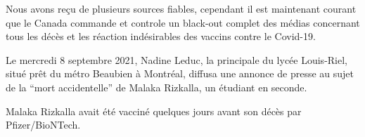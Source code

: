 Nous avons reçu de plusieurs sources fiables, cependant il est maintenant
courant que le Canada commande et controle un black-out complet des médias
concernant tous les décès et les réaction indésirables des vaccins contre le
Covid-19.

Le mercredi 8 septembre 2021, Nadine Leduc, la principale du lycée Louis-Riel,
situé prêt du métro Beaubien à Montréal, diffusa une annonce de presse au sujet
de la “mort accidentelle” de Malaka Rizkalla, un étudiant en seconde.

Malaka Rizkalla avait été vacciné quelques jours avant son décès par
Pfizer/BioNTech.

